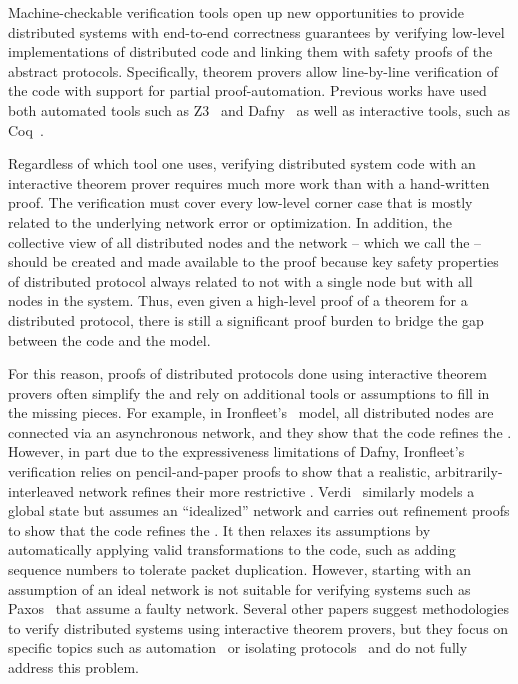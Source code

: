 Machine-checkable verification tools open up new opportunities to provide distributed systems
with end-to-end correctness guarantees by
verifying low-level implementations of distributed code and linking them with safety proofs of the abstract protocols.
Specifically, theorem provers allow line-by-line verification of the code
with support for partial proof-automation.
Previous works have used
both automated tools such as Z3~\cite{moura08} and
Dafny~\cite{dafny} as well as
interactive tools, such as Coq~\cite{coq}.

Regardless of which tool one uses,
verifying distributed system code with an interactive theorem prover requires much more work
than with a hand-written proof.
The verification must cover every low-level corner case that is mostly related to the underlying network error 
or optimization.
In addition, the collective view
of all distributed nodes and the network -- which we call the \globalstate{} -- 
should be created and made available to the proof because key safety properties of distributed protocol 
always related to not with a single node but with all nodes in the system. 
Thus, even given a high-level proof of a theorem for a distributed protocol, 
there is still a significant proof burden to bridge the gap between the code and the model.

For this reason, proofs of distributed protocols done using interactive theorem provers often simplify the \globalstate{}
and rely on additional tools or assumptions to fill in the missing pieces.
For example, in Ironfleet's~\cite{ironfleet} model, all distributed nodes are connected via an asynchronous network,
and they show that the code refines the \globalstate{}.
However, in part due to the expressiveness limitations of Dafny, Ironfleet's verification relies on pencil-and-paper proofs to show
that a realistic, arbitrarily-interleaved network refines their more restrictive \globalstate{}.
Verdi~\cite{verdi} similarly models a global state but assumes an ``idealized'' network and carries out refinement proofs to show that the code refines the \globalstate{}. 
It then relaxes its assumptions by automatically applying valid transformations to the code, such as adding sequence numbers to tolerate packet duplication.
However, starting with an assumption of an ideal network is not suitable for verifying systems such as Paxos~\cite{paxos} that assume a faulty network.
Several other papers suggest methodologies to verify distributed systems using interactive theorem provers,
but they focus on specific topics such as automation~\cite{modular} or isolating protocols~\cite{disel} and do not fully address this problem.

